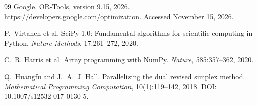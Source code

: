 \begin{thebibliography}{99}
 Google. OR-Tools, version 9.15, 2026. \url{https://developers.google.com/optimization}. Accessed November 15, 2026.

 P.~Virtanen et al. SciPy 1.0: Fundamental algorithms for scientific computing in Python. \emph{Nature Methods}, 17:261--272, 2020.

 C.~R. Harris et al. Array programming with NumPy. \emph{Nature}, 585:357--362, 2020.

 Q.~Huangfu and J.~A.~J. Hall. Parallelizing the dual revised simplex method. \emph{Mathematical Programming Computation}, 10(1):119--142, 2018. DOI: 10.1007/s12532-017-0130-5.

\end{thebibliography}
